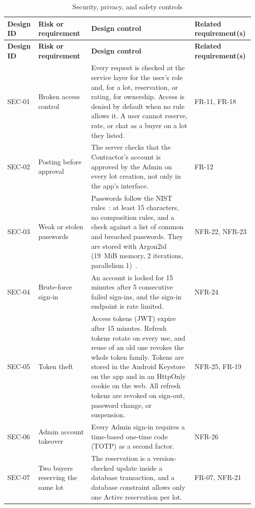 {\small
\begin{longtable}{@{}>{\raggedright\arraybackslash}p{}>{\raggedright\arraybackslash}p{}>{\raggedright\arraybackslash}p{}>{\raggedright\arraybackslash}p{}@{}}
\caption{Security, privacy, and safety controls}\label{tab:security-controls}\\
\toprule
\textbf{Design ID} & \textbf{Risk or requirement} & \textbf{Design control} & \textbf{Related requirement(s)} \\
\midrule
\endfirsthead
\toprule
\textbf{Design ID} & \textbf{Risk or requirement} & \textbf{Design control} & \textbf{Related requirement(s)} \\
\midrule
\endhead
SEC-01 & Broken access control & Every request is checked at the service layer for the user's role and, for a lot, reservation, or rating, for ownership. Access is denied by default when no rule allows it. A user cannot reserve, rate, or chat as a buyer on a lot they listed. & FR-11, FR-18 \\
SEC-02 & Posting before approval & The server checks that the Contractor's account is approved by the Admin on every lot creation, not only in the app's interface. & FR-12 \\
SEC-03 & Weak or stolen passwords & Passwords follow the NIST rules~\citep{nist80063b4}: at least 15 characters, no composition rules, and a check against a list of common and breached passwords. They are stored with Argon2id (19~MiB memory, 2 iterations, parallelism 1)~\citep{owasppasswordstorage}. & NFR-22, NFR-23 \\
SEC-04 & Brute-force sign-in & An account is locked for 15 minutes after 5 consecutive failed sign-ins, and the sign-in endpoint is rate limited. & NFR-24 \\
SEC-05 & Token theft & Access tokens (JWT) expire after 15 minutes. Refresh tokens rotate on every use, and reuse of an old one revokes the whole token family. Tokens are stored in the Android Keystore on the app and in an HttpOnly cookie on the web. All refresh tokens are revoked on sign-out, password change, or suspension. & NFR-25, FR-19 \\
SEC-06 & Admin account takeover & Every Admin sign-in requires a time-based one-time code (TOTP) as a second factor. & NFR-26 \\
SEC-07 & Two buyers reserving the same lot & The reservation is a version-checked update inside a database transaction, and a database constraint allows only one Active reservation per lot. & FR-07, NFR-21 \\

\end{longtable}}
